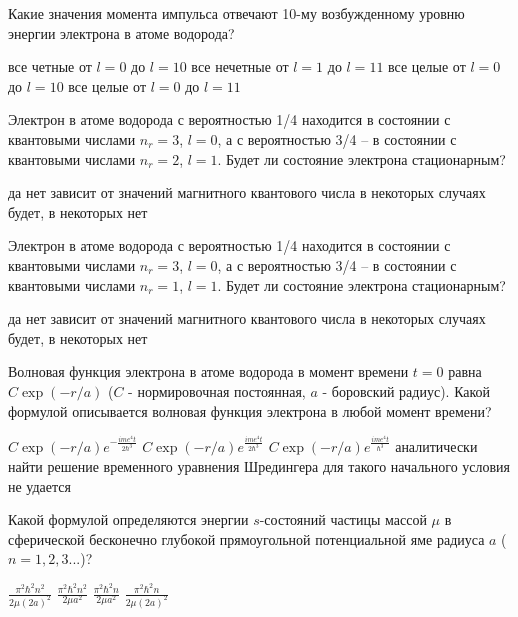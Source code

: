 \documentclass[11pt,a4paper]{exam}
\begin{document}
\begin{questions}
\question  Какие значения момента импульса отвечают 10-му возбужденному уровню энергии электрона в атоме водорода?
\begin{choices}
\choice все четные от $l = 0$ до $l = 10$         
\choice все нечетные от $l = 1$ до $l = 11$
\choice все целые от $l = 0$ до $l = 10$       
\choice все целые от $l = 0$ до $l = 11$
\end{choices}

\question Электрон в атоме водорода с вероятностью 1/4 находится в состоянии с квантовыми числами ${n_r} = 3$, $l = 0$, а с вероятностью 3/4 – в состоянии с квантовыми числами ${n_r} = 2$, $l = 1$. Будет ли состояние электрона стационарным?
\begin{choices}
\choice да                         
\choice нет         
\choice зависит от значений магнитного квантового числа    
\choice в некоторых случаях будет, в некоторых нет
\end{choices}

\question  Электрон в атоме водорода с вероятностью 1/4 находится в состоянии с квантовыми числами ${n_r} = 3$, $l = 0$, а с вероятностью 3/4 – в состоянии с квантовыми числами ${n_r} = 1$, $l = 1$. Будет ли состояние электрона стационарным?
\begin{choices}
\choice да                         
\choice нет
\choice зависит от значений магнитного квантового числа    
\choice в некоторых случаях будет, в некоторых нет
\end{choices}

\question Волновая функция электрона в атоме водорода в момент времени $t = 0$ равна $C\exp ( - r/a)$ ($C$ - нормировочная постоянная, $a$ - боровский радиус). Какой формулой описывается волновая функция электрона в любой момент времени?
\begin{choices}
\choice $C\exp ( - r/a){e^{ - \frac{{im{e^4}t}}{{2{\hbar ^3}}}}}$         
\choice $C\exp ( - r/a){e^{\frac{{im{e^4}t}}{{2{\hbar ^3}}}}}$         
\choice $C\exp ( - r/a){e^{\frac{{im{e^4}t}}{{{\hbar ^3}}}}}$ 
\choice аналитически найти решение временного уравнения Шредингера для такого начального условия не удается
\end{choices}

\question Какой формулой определяются энергии $s$-состояний частицы массой $\mu $ в сферической бесконечно глубокой прямоугольной потенциальной яме радиуса $a$ ($n = 1,2,3...$)?
\begin{choices}
\choice $\frac{{{\pi ^2}{\hbar ^2}{n^2}}}{{2\mu {{(2a)}^2}}}$       
\choice $\frac{{{\pi ^2}{\hbar ^2}{n^2}}}{{2\mu {a^2}}}$         
\choice $\frac{{{\pi ^2}{\hbar ^2}n}}{{2\mu {a^2}}}$       
\choice $\frac{{{\pi ^2}{\hbar ^2}n}}{{2\mu {{(2a)}^2}}}$
\end{choices}


\end{questions}
\end{document}
